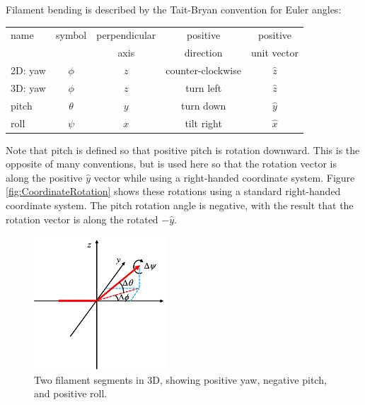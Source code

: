 \documentclass {scrbook}
\begin{document}
Filament bending is described by the Tait-Bryan convention for Euler angles:
\begin{longtable}[c]{lcccc}
name & symbol & perpendicular & positive & positive \\
 &  & axis & direction & unit vector \\
\hline
2D: yaw & $\phi$ & $z$ & counter-clockwise & $\hat{z}$ \\
\hline
3D: yaw & $\phi$ & $z$ & turn left & $\hat{z}$ \\
\hspace{3.5ex} pitch & $\theta$ & $y$ & turn down & $\hat{y}$ \\
\hspace{3.5ex} roll & $\psi$ & $x$ & tilt right & $\hat{x}$
\end{longtable}
Note that pitch is defined so that positive pitch is rotation downward. This is the opposite of many conventions, but is used here so that the rotation vector is along the positive $\hat{y}$ vector while using a right-handed coordinate system. Figure \ref{fig:CoordinateRotation} shows these rotations using a standard right-handed coordinate system. The pitch rotation angle is negative, with the result that the rotation vector is along the rotated $-\hat{y}$.
\begin{figure}[h]
\centering
\includegraphics[height=5cm]{figures/FilamentBend3D.png}
\caption{Two filament segments in 3D, showing positive yaw, negative pitch, and positive roll.}
\label{fig:FilamentBend3D}
\end{figure}
\end{document}
